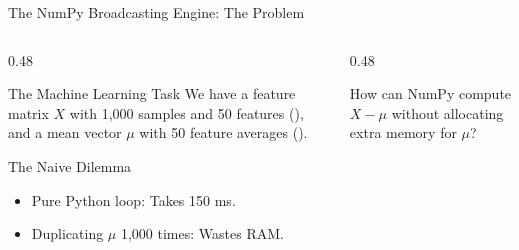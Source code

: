 \begin{frame}{The NumPy Broadcasting Engine: The Problem}
  \begin{columns}[T,onlytextwidth]
    \begin{column}{0.48\textwidth}
      \begin{ConceptBox}{The Machine Learning Task}
        \scriptsize We have a feature matrix $X$ with 1,000 samples and 50 features (), and a mean vector $\mu$ with 50 feature averages ().
      \end{ConceptBox}
      \vspace{0.10cm}
      \begin{WarningBox}{The Naive Dilemma}
        \scriptsize
        \begin{itemize}
          \item Pure Python loop: Takes 150 ms.
          \item Duplicating $\mu$ 1,000 times: Wastes RAM.
        \end{itemize}
      \end{WarningBox}
    \end{column}
    \begin{column}{0.48\textwidth}
      \begin{center}
      \end{center}
      \vspace{0.10cm}
      {\scriptsize\color{UpGradSlate}How can NumPy compute $X - \mu$ without allocating extra memory for $\mu$?}
    \end{column}
  \end{columns}
\end{frame}

